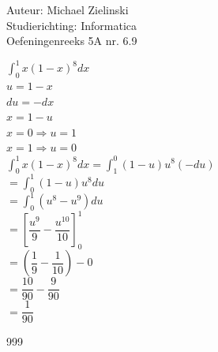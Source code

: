 \documentclass[a4paper]{article}
\begin{document}
  
\noindent \large Auteur: Michael Zielinski \\
\noindent \large Studierichting: Informatica\\
\noindent \large Oefeningenreeks 5A nr. 6.9\\

\medskip

\normalsize

$ \displaystyle\int^1_0 x(1-x)^8 dx $ \\

$ u = 1-x $ \\

$ du = -dx $ \\

$ x = 1-u $ \\

$ x = 0 \Rightarrow u = 1 $ \\

$ x = 1 \Rightarrow u = 0 $ \\

$ \displaystyle\int^1_0 x(1-x)^8 dx
= \displaystyle\int^0_1 (1-u)u^8(-du) $ \\

$ = \displaystyle\int^1_0 (1-u)u^8 du $ \\

$ = \displaystyle\int^1_0 (u^8 - u^9)du $ \\

$ = \left[ \dfrac{u^9}{9} - \dfrac{u^{10}}{10} \right]^1_0 $ \\

$ = \left( \dfrac{1}{9} - \dfrac{1}{10} \right) - 0 $ \\

$ = \dfrac{10}{90} - \dfrac{9}{90} $ \\

$ = \dfrac{1}{90} $ \\



\begin{thebibliography}{999}
\end{thebibliography}
\end{document}
